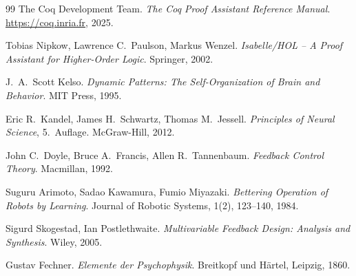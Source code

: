\documentclass[a4paper,12pt]{article}
\theoremstyle{definition}
\begin{document}
\begin{thebibliography}{99}
The Coq Development Team.
\textit{The Coq Proof Assistant Reference Manual}.
\url{https://coq.inria.fr}, 2025.

Tobias Nipkow, Lawrence C.\ Paulson, Markus Wenzel.
\textit{Isabelle/HOL -- A Proof Assistant for Higher-Order Logic}.
Springer, 2002.

J.\ A.\ Scott Kelso.
\textit{Dynamic Patterns: The Self-Organization of Brain and Behavior}.
MIT Press, 1995.

Eric R.\ Kandel, James H.\ Schwartz, Thomas M.\ Jessell.
\textit{Principles of Neural Science}, 5.\ Auflage.
McGraw-Hill, 2012.

John C.\ Doyle, Bruce A.\ Francis, Allen R.\ Tannenbaum.
\textit{Feedback Control Theory}.
Macmillan, 1992.

Suguru Arimoto, Sadao Kawamura, Fumio Miyazaki.
\textit{Bettering Operation of Robots by Learning}.
Journal of Robotic Systems, 1(2), 123--140, 1984.

Sigurd Skogestad, Ian Postlethwaite.
\textit{Multivariable Feedback Design: Analysis and Synthesis}.
Wiley, 2005.

Gustav Fechner.
\textit{Elemente der Psychophysik}.
Breitkopf und Härtel, Leipzig, 1860.

\end{thebibliography}
\end{document}
